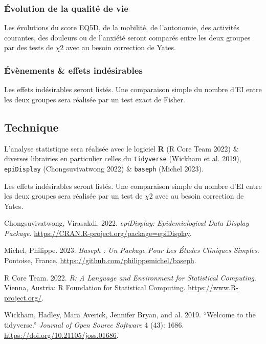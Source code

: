 \documentclass[
]{article}
\newlength{\cslhangindent}
\newlength{\cslentryspacingunit} %
\newenvironment{CSLReferences}[2] %
 {%
  \setlength{\parindent}{0pt}
  \ifodd #1
  \let\oldpar\par
  \def\par{\hangindent=\cslhangindent\oldpar}
  \fi
  \setlength{\parskip}{#2\cslentryspacingunit}
 }%
 {}
\begin{document}
\hypertarget{uxe9volution-de-la-qualituxe9-de-vie}{%
\subsubsection{Évolution de la qualité de
vie}\label{uxe9volution-de-la-qualituxe9-de-vie}}

Les évolutions du score EQ5D, de la mobilité, de l'autonomie, des
activités courantes, des douleurs ou de l'anxiété seront comparés entre
les deux groupes par des tests de \(\chi 2\) avec au besoin correction
de Yates.

\hypertarget{uxe9vuxe8nements-effets-induxe9sirables}{%
\subsubsection{Évènements \& effets
indésirables}\label{uxe9vuxe8nements-effets-induxe9sirables}}

Les effets indésirables seront listés. Une comparaison simple du nombre
d'EI entre les deux groupes sera réalisée par un test exact de Fisher.

\hypertarget{technique}{%
\subsection{Technique}\label{technique}}

L'analyse statistique sera réalisée avec le logiciel \textbf{R} (R Core
Team 2022) \& diverses librairies en particulier celles du
\texttt{tidyverse} (Wickham et al. 2019), \texttt{epiDisplay}
(Chongsuvivatwong 2022) \& \texttt{baseph} (Michel 2023).

Les effets indésirables seront listés. Une comparaison simple du nombre
d'EI entre les deux groupes sera réalisée par un test de \(\chi 2\) avec
au besoin correction de Yates.

\hypertarget{refs}{}
\begin{CSLReferences}{1}{0}
\leavevmode{}%
Chongsuvivatwong, Virasakdi. 2022. \emph{epiDisplay: Epidemiological
Data Display Package}.
\url{https://CRAN.R-project.org/package=epiDisplay}.

\leavevmode{}%
Michel, Philippe. 2023. \emph{Baseph : Un Package Pour Les Études
Cliniques Simples}. Pontoise, France.
\url{https://github.com/philippemichel/baseph}.

\leavevmode{}%
R Core Team. 2022. \emph{R: A Language and Environment for Statistical
Computing}. Vienna, Austria: R Foundation for Statistical Computing.
\url{https://www.R-project.org/}.

\leavevmode{}%
Wickham, Hadley, Mara Averick, Jennifer Bryan, and al. 2019. {``Welcome
to the {tidyverse}.''} \emph{Journal of Open Source Software} 4 (43):
1686. \url{https://doi.org/10.21105/joss.01686}.

\end{CSLReferences}
\end{document}
